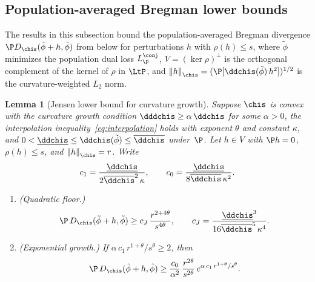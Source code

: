\documentclass{article}
\newtheorem{lemma}[theorem]{Lemma}
\begin{document}
\subsection{Population-averaged Bregman lower bounds}

The results in this subsection
bound the population-averaged Bregman divergence
$\P D_{\chis}(\tilde\phi + h, \tilde\phi)$
from below
for perturbations $h$ with $\rho(h) \le s$,
where $\tilde\phi$ minimizes the population dual loss $L^\conj_{\P}$,
$V = (\ker\rho)^{\perp}$ is the orthogonal complement
of the kernel of $\rho$ in $\LtP$,
and $\norm{h}_{\chis} = (\P[\ddchis(\tilde\phi)\, h^2])^{1/2}$
is the curvature-weighted $L_2$ norm.

\begin{lemma}[Jensen lower bound for curvature growth]
\label{lem:jensen-lower}
Suppose $\chis$ is convex with
the curvature growth condition
$\dddchis \ge \alpha\, \ddchis$
for some $\alpha > 0$,
the interpolation inequality~\eqref{eq:interpolation}
holds with exponent $\theta$ and constant $\kappa$,
and $0 < \underline{\ddchis} \le \ddchis(\tilde\phi) \le \overline{\ddchis}$
under~$\P$.
Let $h \in V$
with $\P h = 0$, $\rho(h) \le s$,
and $\norm{h}_{\chis} = r$.
Write
\[
c_1 = \frac{\underline{\ddchis}}
  {2\overline{\ddchis}^2\, \kappa},
\qquad
c_0 = \frac{\underline{\ddchis}}
  {8\overline{\ddchis}\, \kappa^2}.
\]
\begin{enumerate}
\item[\textup{(i)}]
  \textup{(Quadratic floor.)}
  \begin{equation}
  \label{eq:jensen-quadratic-floor}
  \P\, D_{\chis}(\tilde\phi + h, \tilde\phi)
    \ge c_J\, \frac{r^{2+4\theta}}{s^{4\theta}},
  \qquad
  c_J = \frac{\underline{\ddchis}^3}
    {16\overline{\ddchis}^5\, \kappa^4}.
  \end{equation}

\item[\textup{(ii)}]
  \textup{(Exponential growth.)}
  If $\alpha\, c_1\, r^{1+\theta}/s^\theta \ge 2$, then
  \begin{equation}
  \label{eq:jensen-bregman-lower}
  \P\, D_{\chis}(\tilde\phi + h, \tilde\phi)
    \ge \frac{c_0}{\alpha^2}\,
      \frac{r^{2\theta}}{s^{2\theta}}\,
      e^{\alpha\, c_1\, r^{1+\theta}/s^\theta}.
  \end{equation}
\end{enumerate}
\end{lemma}
\end{document}
